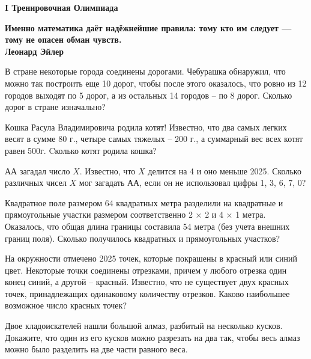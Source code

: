 \centerline{\bf \Huge I Тренировочная Олимпиада}

\begin{flushright}
        \scriptsize{\textbf{Именно математика даёт надёжнейшие правила: тому кто им следует — тому не опасен обман чувств.\\
         Леонард Эйлер}}
        
\end{flushright}

 В стране некоторые города соединены дорогами. Чебурашка обнаружил, что можно так построить
еще 10 дорог, чтобы после этого оказалось, что ровно из 12 городов выходят по 5 дорог, а из остальных
14 городов – по 8 дорог. Сколько дорог в стране изначально?

 Кошка Расула Владимировича родила котят! Известно, что два самых
легких весят в сумме 80 г., четыре самых тяжелых – 200 г., а
суммарный вес всех котят равен 500г. Cколько котят родила кошка?

 АА загадал число $X$. Известно, что $X$ делится на 4 и оно меньше 2025. Сколько различных чисел $X$ мог загадать АА, если он не использовал цифры 1, 3, 6, 7, 0?

 Квадратное поле размером 64 квадратных метра разделили на квадратные и прямоугольные
участки размером соответственно 2 × 2 и 4 × 1 метра. Оказалось, что общая длина границы
составила 54 метра (без учета внешних границ поля). Сколько получилось квадратных и
прямоугольных участков?

 На окружности отмечено 2025 точек, которые покрашены в красный или синий цвет.
Некоторые точки соединены отрезками, причем у любого отрезка один конец
синий, а другой – красный. Известно, что не существует двух красных точек,
принадлежащих одинаковому количеству отрезков. Каково наибольшее
возможное число красных точек?


 Двое кладоискателей нашли большой алмаз, разбитый на несколько кусков. Докажите, что один
из его кусков можно разрезать на два так, чтобы весь алмаз можно было разделить на две части
равного веса.